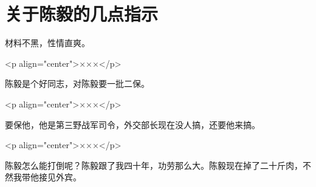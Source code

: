 \section[关于陈毅的几点指示（一九六七年八月十一日）]{关于陈毅的几点指示}


材料不黑，性情直爽。

<p align="center">×××</p>

陈毅是个好同志，对陈毅要一批二保。

<p align="center">×××</p>

要保他，他是第三野战军司令，外交部长现在没人搞，还要他来搞。

<p align="center">×××</p>

陈毅怎么能打倒呢？陈毅跟了我四十年，功劳那么大。陈毅现在掉了二十斤肉，不然我带他接见外宾。


